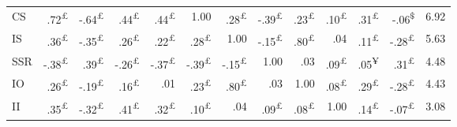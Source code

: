 \documentclass{singlecol-new}
\theoremstyle{TH}{
\newtheorem{lemma}{Lemma}
\newtheorem{theorem}[lemma]{Theorem}
\newtheorem{corrolary}[lemma]{Corrolary}
\newtheorem{conjecture}[lemma]{Conjecture}
\newtheorem{proposition}[lemma]{Proposition}
\newtheorem{claim}[lemma]{Claim}
\newtheorem{stheorem}[lemma]{Wrong Theorem}
\newtheorem{algorithm}{Algorithm}
}
\theoremstyle{THrm}{
\newtheorem{definition}{Definition}[section]
\newtheorem{question}{Question}[section]
\newtheorem{remark}{Remark}
\newtheorem{scheme}{Scheme}
}
\theoremstyle{THhit}{
\newtheorem{case}{Case}[section]
}
\begin{document}
\begin{table*}[h!]
\begin{tabular}{lrrrrrrrrrrrr}
		CS & \cellcolor{gray!36}.72\textsuperscript{£} & \cellcolor{gray!32}-.64\textsuperscript{£} & \cellcolor{gray!22}.44\textsuperscript{£} & \cellcolor{gray!22}.44\textsuperscript{£} & \cellcolor{gray!50}1.00 & \cellcolor{gray!14}.28\textsuperscript{£} & \cellcolor{gray!19}-.39\textsuperscript{£} & \cellcolor{gray!11}.23\textsuperscript{£} & \cellcolor{gray!5}.10\textsuperscript{£} & \cellcolor{gray!15}.31\textsuperscript{£} & \cellcolor{gray!3}-.06\textsuperscript{\$} & 6.92 \\ 
		
		IS & \cellcolor{gray!18}.36\textsuperscript{£} & \cellcolor{gray!17}-.35\textsuperscript{£} & \cellcolor{gray!13}.26\textsuperscript{£} & \cellcolor{gray!11}.22\textsuperscript{£} & \cellcolor{gray!14}.28\textsuperscript{£} & \cellcolor{gray!50}1.00 & \cellcolor{gray!7}-.15\textsuperscript{£} & \cellcolor{gray!40}.80\textsuperscript{£} & \cellcolor{gray!2}.04 & \cellcolor{gray!5}.11\textsuperscript{£} & \cellcolor{gray!14}-.28\textsuperscript{£} & 5.63 \\ 
		
		SSR & \cellcolor{gray!19}-.38\textsuperscript{£} & \cellcolor{gray!19}.39\textsuperscript{£} & \cellcolor{gray!13}-.26\textsuperscript{£} & \cellcolor{gray!18}-.37\textsuperscript{£} & \cellcolor{gray!19}-.39\textsuperscript{£} & \cellcolor{gray!7}-.15\textsuperscript{£} & \cellcolor{gray!50}1.00 & \cellcolor{gray!1}.03 & \cellcolor{gray!4}.09\textsuperscript{£} & \cellcolor{gray!2}.05\textsuperscript{¥} & \cellcolor{gray!15}.31\textsuperscript{£} & 4.48 \\ 
		
		IO & \cellcolor{gray!13}.26\textsuperscript{£} & \cellcolor{gray!9}-.19\textsuperscript{£} & \cellcolor{gray!8}.16\textsuperscript{£} & \cellcolor{gray!0}.01 & \cellcolor{gray!11}.23\textsuperscript{£} & \cellcolor{gray!40}.80\textsuperscript{£} & \cellcolor{gray!1}.03 & \cellcolor{gray!50}1.00 & \cellcolor{gray!4}.08\textsuperscript{£} & \cellcolor{gray!14}.29\textsuperscript{£} & \cellcolor{gray!14}-.28\textsuperscript{£} & 4.43 \\ 
		
		II & \cellcolor{gray!17}.35\textsuperscript{£} & \cellcolor{gray!16}-.32\textsuperscript{£} & \cellcolor{gray!20}.41\textsuperscript{£} & \cellcolor{gray!16}.32\textsuperscript{£} & \cellcolor{gray!5}.10\textsuperscript{£} & \cellcolor{gray!2}.04 & \cellcolor{gray!4}.09\textsuperscript{£} & \cellcolor{gray!4}.08\textsuperscript{£} & \cellcolor{gray!50}1.00 & \cellcolor{gray!7}.14\textsuperscript{£} & \cellcolor{gray!3}-.07\textsuperscript{£} & 3.08 \\ 
		

\end{tabular}
\end{table*}
\end{document}
